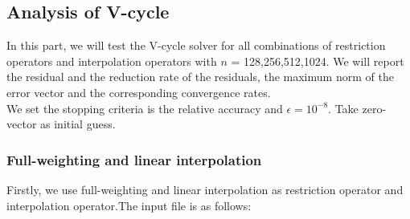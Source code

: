 \documentclass[a4paper,twocolumn]{article}
\theoremstyle{definition}
\begin{document}
\subsection{Analysis of V-cycle}
In this part, we will test the V-cycle solver for all combinations of restriction operators and interpolation operators with $n$ = 128,256,512,1024. We will report the residual and the reduction rate of the residuals, the maximum norm of the error vector and the corresponding convergence rates.\\
We set the stopping criteria is the relative accuracy and $\epsilon = 10^{-8}$. Take zero-vector  as initial guess.
\subsubsection{Full-weighting and linear interpolation}
Firstly, we use full-weighting and linear interpolation as restriction operator and interpolation operator.The input file is as follows:
\\
\end{document}
